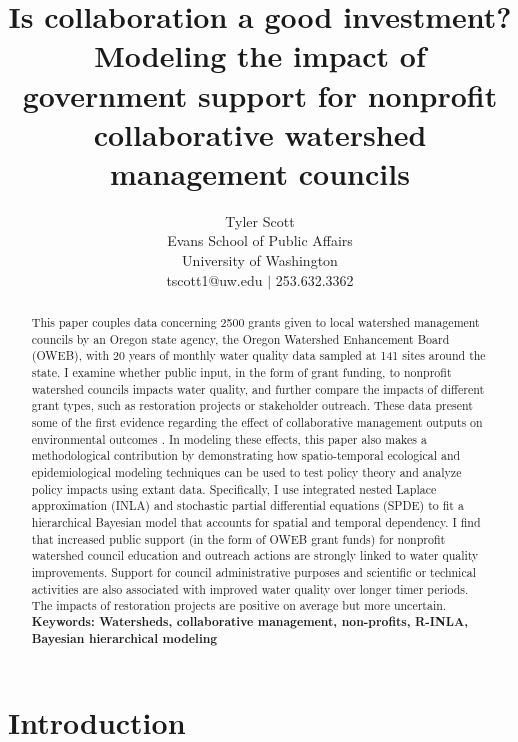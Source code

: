 \documentclass[11pt,a4paper,titlepage]{article}
\title{Is collaboration a good investment? Modeling the impact of government support for nonprofit collaborative watershed management councils}
\author{Tyler Scott\\ Evans School of Public Affairs\\University of Washington\\tscott1@uw.edu $|$ 253.632.3362}
\begin{document}
\maketitle

\begin{abstract}

This paper couples data concerning 2500 grants given to local watershed management councils by an Oregon state agency, the Oregon Watershed Enhancement Board (OWEB), with 20 years of monthly water quality data sampled at 141 sites around the state. I examine whether public input, in the form of grant funding, to nonprofit watershed councils impacts water quality, and further compare the impacts of different grant types, such as restoration projects or stakeholder outreach. These data present some of the first evidence regarding the effect of collaborative management outputs on environmental outcomes \parencite{carr2012,koontz2006}. In modeling these effects, this paper also makes a methodological contribution by demonstrating how spatio-temporal ecological and epidemiological modeling techniques can be used to test policy theory and analyze policy impacts using extant data. Specifically, I use integrated nested Laplace approximation (INLA) \parencite{rue2009} and stochastic partial differential equations (SPDE) \parencite{lindgren2011} to fit a hierarchical Bayesian model that accounts for spatial and temporal dependency. I find that increased public support (in the form of OWEB grant funds) for nonprofit watershed council education and outreach actions are strongly linked to water quality improvements. Support for council administrative purposes and scientific or technical activities are also associated with improved water quality over longer timer periods. The impacts of restoration projects are positive on average but more uncertain.\\


\noindent
\bf{Keywords}: Watersheds, collaborative management, non-profits, R-INLA, Bayesian hierarchical modeling
\end{abstract}


\section*{Introduction}
\end{document}
